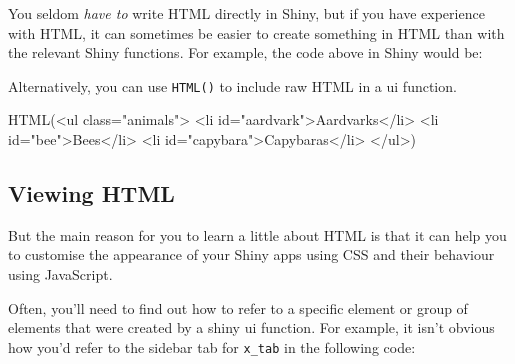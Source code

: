 \documentclass[
]{book}
\newenvironment{Shaded}{\begin{snugshade}}{\end{snugshade}}
\newcommand{\AttributeTok}[1]{\textcolor[rgb]{0.77,0.63,0.00}{#1}}
\newcommand{\FunctionTok}[1]{\textcolor[rgb]{0.00,0.00,0.00}{#1}}
\newcommand{\NormalTok}[1]{#1}
\newcommand{\SpecialCharTok}[1]{\textcolor[rgb]{0.00,0.00,0.00}{#1}}
\newcommand{\StringTok}[1]{\textcolor[rgb]{0.31,0.60,0.02}{#1}}
\begin{document}
You seldom \emph{have to} write HTML directly in Shiny, but if you have experience with HTML, it can sometimes be easier to create something in HTML than with the relevant Shiny functions. For example, the code above in Shiny would be:

\begin{Shaded}
\end{Shaded}

Alternatively, you can use \texttt{HTML()} to include raw HTML in a ui function.

\begin{Shaded}
\begin{Highlighting}[]
\FunctionTok{HTML}\NormalTok{(}\StringTok{\textquotesingle{}\textless{}ul class="animals"\textgreater{}}
\StringTok{    \textless{}li id="aardvark"\textgreater{}Aardvarks\textless{}/li\textgreater{}}
\StringTok{    \textless{}li id="bee"\textgreater{}Bees\textless{}/li\textgreater{}}
\StringTok{    \textless{}li id="capybara"\textgreater{}Capybaras\textless{}/li\textgreater{}}
\StringTok{\textless{}/ul\textgreater{}\textquotesingle{}}\NormalTok{)}
\end{Highlighting}
\end{Shaded}

\hypertarget{viewing-html}{%
\subsection{Viewing HTML}\label{viewing-html}}

But the main reason for you to learn a little about HTML is that it can help you to customise the appearance of your Shiny apps using CSS and their behaviour using JavaScript.

Often, you'll need to find out how to refer to a specific element or group of elements that were created by a shiny ui function. For example, it isn't obvious how you'd refer to the sidebar tab for \texttt{x\_tab} in the following code:
\end{document}

